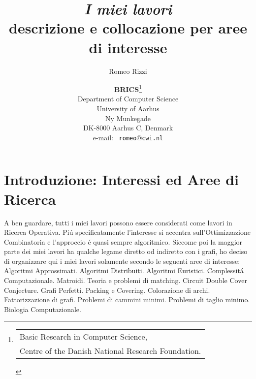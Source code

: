 \documentclass[10pt]{article}
\begin{document}
\title{\vspace*{-2.8cm}
            {\em I miei lavori}\\
            {\large descrizione e collocazione per aree di interesse}}

\author{Romeo Rizzi}
\date{{\bf BRICS}\thanks{%
  \protect\begin{tabular}[t]{@{}l@{}}
     Basic Research in Computer Science,\protect\\
     Centre of the Danish National Research Foundation.
  \protect\end{tabular}}\\
  Department of Computer Science\\
  University of Aarhus\\
  Ny Munkegade\\
  DK-8000 Aarhus C, Denmark\\
\vspace*{2pt}
  {e-mail: \ \tt romeo$@$cwi.nl}}

\maketitle

\vspace*{-20pt}



\section{Introduzione: Interessi ed Aree di Ricerca}

A ben guardare,
tutti i miei lavori possono essere considerati
come lavori in Ricerca Operativa.
Pi\'u specificatamente l'interesse si
accentra sull'Ottimizzazione Combinatoria
e l'approccio \'e quasi sempre algoritmico.
Siccome poi la maggior parte dei
miei lavori ha qualche legame diretto
od indiretto con i grafi,
ho deciso di organizzare qui
i miei lavori solamente secondo le seguenti
aree di interesse:\\

Algoritmi Approssimati.
Algoritmi Distribuiti.
Algoritmi Euristici.
Complessit\'a Computazionale.
Matroidi.
Teoria e problemi di matching.
Circuit Double Cover Conjecture.
Grafi Perfetti.
Packing e Covering.
Colorazione di archi.
Fattorizzazione di grafi.
Problemi di cammini minimi.
Problemi di taglio minimo.
Biologia Computazionale.\\
\end{document}
